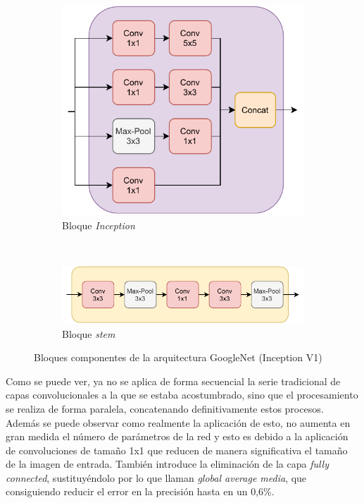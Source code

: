 \begin{itemize}
    \begin{figure}[!h]
    \centering
    \begin{subfigure}{0.45\textwidth}
        \centering
        \includegraphics[width=\textwidth]{figuras/desarrollo teorico/desarrollo_teorico-Inception V1-inception.pdf} 
        \caption{Bloque \textit{Inception}}
        \label{fig:inception_bloque}
    \end{subfigure}
    \hfill\\
    \begin{subfigure}{0.65\textwidth}
        \centering
        \includegraphics[width=\textwidth]{figuras/desarrollo teorico/desarrollo_teorico-Inception V1-stem.pdf} 
        \caption{Bloque \textit{stem}}
        \label{fig:stem_bloque}
    \end{subfigure}
    \caption{Bloques componentes de la arquitectura GoogleNet (Inception V1)}
    \label{fig:bloques_inceptionv1}
    \end{figure}
    
    Como se puede ver, ya no se aplica de forma secuencial la serie tradicional de capas convolucionales a la que se estaba acostumbrado, sino que el procesamiento se realiza de forma paralela, concatenando definitivamente estos procesos. Además se puede observar como realmente la aplicación de esto, no aumenta en gran medida el número de parámetros de la red y esto es debido a la aplicación de convoluciones de tamaño 1x1 que reducen de manera significativa el tamaño de la imagen de entrada. También introduce la eliminación de la capa \textit{fully connected}, sustituyéndolo por lo que llaman \textit{global average media}, que consiguiendo reducir el error en la precisión hasta en un 0,6\%.
    

\end{itemize}
